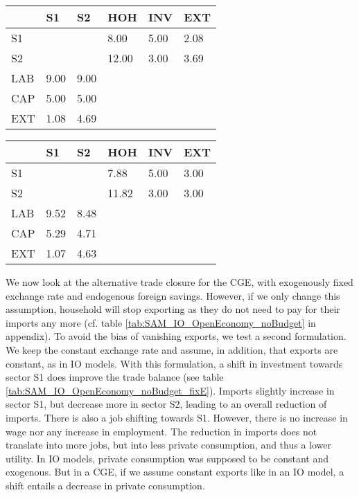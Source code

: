 \begin{table*}[!h]
	\centering
		\caption{CGE results in an open economy with fixed foreign savings $S^f$}
		\label{tab:SAM_CGE_openEconomy}
		\begin{tabular}{llllll}
			\toprule
			& S1 & S2 & HOH & INV &  EXT\\
			\midrule
			S1 &  &  & 8.00 & 5.00 & 2.08 \\
			S2 &  &  & 12.00 & 3.00 & 3.69 \\
			LAB & 9.00 & 9.00 &  &  &  \\
			CAP & 5.00 & 5.00 &  &  &  \\
			EXT & 1.08 & 4.69 &  &  &  \\
			\bottomrule
		\end{tabular}
\end{table*}
\begin{table*}[!h]
		\centering
		\caption{Open economy with fixed exchange rate $\epsilon$ and fixed exports}
		\label{tab:SAM_IO_OpenEconomy_noBudget_fixE}
		\begin{tabular}{llllll}
			\toprule
			& S1 & S2 & HOH & INV & EXT \\
			\midrule
			S1 &  &  & 7.88 & 5.00 & 3.00 \\
			S2 &  &  & 11.82 & 3.00 & 3.00 \\
			LAB & 9.52 & 8.48 &  &  &  \\
			CAP & 5.29 & 4.71 &  &  &  \\
			EXT & 1.07 & 4.63 &  &  &  \\
			\bottomrule
		\end{tabular}
\end{table*}
We now look at the alternative trade closure for the CGE, with exogenously fixed exchange rate and endogenous foreign savings. However, if we only change this assumption, household will stop exporting as they do not need to pay for their imports any more (cf. table \ref{tab:SAM_IO_OpenEconomy_noBudget} in appendix). 
To avoid the bias of vanishing exports, we test a second formulation. We keep the constant exchange rate and assume, in addition, that exports are constant, as in IO models. With this formulation, a shift in investment towards sector S1 does improve the trade balance (see table \ref{tab:SAM_IO_OpenEconomy_noBudget_fixE}). 
Imports slightly increase in sector S1, but decrease more in sector S2, leading to an overall reduction of imports. There is also a job shifting towards S1.
However, there is no increase in wage nor any increase in employment. The reduction in imports does not translate into more jobs, but into less private consumption, and thus a lower utility.
In IO models, private consumption was supposed to be constant and exogenous. But in a CGE, if we assume constant exports like in an IO model, a shift entails a decrease in private consumption.

